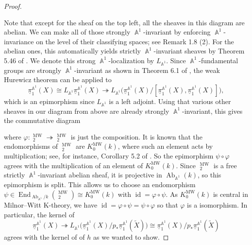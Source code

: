 \documentclass[english]{amsart}
\theoremstyle{definition}
\DeclareMathOperator{\A}{\mathbb{A}}
\DeclareMathOperator{\id}{id}
\DeclareMathOperator{\End}{End}
\DeclareMathOperator{\Ab}{Ab}
\DeclareMathOperator{\KK}{\underline{K}}
\DeclareMathOperator{\MW}{MW}
\begin{document}
\begin{proof}
\begin{center}
\end{center}
Note that except for the sheaf on the top left, all the sheaves in this diagram are abelian. We can make all of those strongly $\A^1$-invariant by enforcing $\A^1$-invariance on the level of their classifying spaces; see Remark 1.8 (2). For the abelian ones, this automatically yields strictly $\A^1$-invariant sheaves by Theorem 5.46 of \cite{MR2934577}. We denote this strong $\A^1$-localization by $L_{\A^1}$. Since $\A^1$-fundamental groups are strongly $\A^1$-invariant as shown in Theorem 6.1 of \cite{MR2934577}, the weak Hurewicz theorem \cite[Theorem 6.35]{MR2934577} can be applied to $$\underline{\pi}_1^{\A^1}\!(X) \cong L_{\A^1}\underline{\pi}_1^{\A^1}\!(X) \twoheadrightarrow L_{\A^1}\bigl(\underline{\pi}_1^{\A^1}\!(X)/[\underline{\pi}_1^{\A^1}\!(X),\underline{\pi}_1^{\A^1}\!(X)]\bigr),$$
which is an epimorphism since $L_{\A^1}$ is a left adjoint. 
Using that various other sheaves in our diagram from above are already strongly $\A^1$-invariant, this gives the commutative diagram
\begin{center}
\end{center}
where $\varphi \colon \KK^{\MW}_2 \twoheadrightarrow \KK^{\MW}_2$ is just the composition. It is known that the endomorphisms of $\KK^{\MW}_2$ are $K^{\MW}_0(k)$, where such an element acts by multiplication; see, for instance, Corollary 5.2 of \cite{MR4874195}. So the epimorphism $\psi \circ \varphi$ agrees with the multiplication of an element of $K^{\MW}_0(k)$. Since $\KK^{\MW}_2$ is a free strictly $\A^1$-invariant abelian sheaf, it is projective in $\Ab_{\A^1}(k)$, so this epimorphism is split. This allows us to choose an endomorphism $\psi \in \End_{\Ab_{\A^1} \!/ k}(\KK^{\MW}_2) \cong K^{\MW}_0(k)$ with $\id = \varphi \circ \psi$. As $K^{\MW}_0(k)$ is central in Milnor--Witt K-theory, we have $\id = \varphi \circ \psi = \psi \circ \varphi$ so that $\varphi$ is a isomorphism. In particular, the kernel of 
$$\underline{\pi}_1^{\A^1}\!(X) \twoheadrightarrow L_{\A^1}\bigl(\underline{\pi}_1^{\A^1}\!(X)/p_*\underline{\pi}_1^{\A^1}\!(\widetilde{X})\bigr) \cong \underline{\pi}_1^{\A^1}\!(X)/p_*\underline{\pi}_1^{\A^1}\!(\widetilde{X})$$
agrees with the kernel of of $h$ as we wanted to show.
\end{proof}
\end{document}
